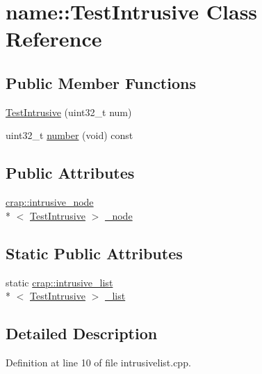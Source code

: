 \hypertarget{classname_1_1_test_intrusive}{\section{name\+:\+:Test\+Intrusive Class Reference}
\label{classname_1_1_test_intrusive}
}
\subsection*{Public Member Functions}
\begin{DoxyCompactItemize}
\item 
\hyperlink{classname_1_1_test_intrusive_a21b5c3b499d62b3ed215ca5e1f25e18d}{Test\+Intrusive} (uint32\+\_\+t num)
\item 
uint32\+\_\+t \hyperlink{classname_1_1_test_intrusive_a036cb0079daf17420058b375c26e198b}{number} (void) const 
\end{DoxyCompactItemize}
\subsection*{Public Attributes}
\begin{DoxyCompactItemize}
\item 
\hyperlink{classcrap_1_1intrusive__node}{crap\+::intrusive\+\_\+node}\\*
$<$ \hyperlink{classname_1_1_test_intrusive}{Test\+Intrusive} $>$ \hyperlink{classname_1_1_test_intrusive_a760f804cb22c2193d33c1c95202060ff}{\+\_\+node}
\end{DoxyCompactItemize}
\subsection*{Static Public Attributes}
\begin{DoxyCompactItemize}
\item 
static \hyperlink{singletoncrap_1_1intrusive__list}{crap\+::intrusive\+\_\+list}\\*
$<$ \hyperlink{classname_1_1_test_intrusive}{Test\+Intrusive} $>$ \hyperlink{classname_1_1_test_intrusive_a8881f33d937f971bacdacbdb4a85f0a8}{\+\_\+list}
\end{DoxyCompactItemize}


\subsection{Detailed Description}


Definition at line 10 of file intrusivelist.\+cpp.




